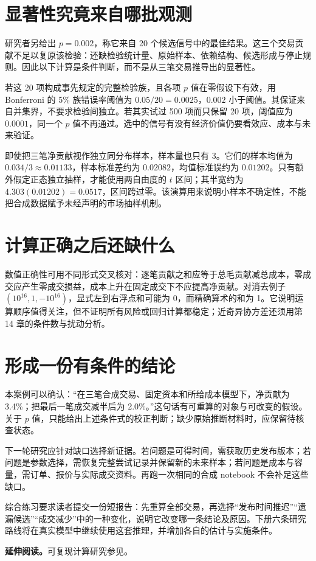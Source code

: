 \section{显著性究竟来自哪批观测}
研究者另给出 $p=0.002$，称它来自 20 个候选信号中的最佳结果。这三个交易贡献不足以复原该检验：还缺检验统计量、原始样本、依赖结构、候选形成与停止规则。因此以下计算是条件判断，而不是从三笔交易推导出的显著性。

若这 20 项构成事先规定的完整检验族，且各项 $p$ 值在零假设下有效，用 Bonferroni 的 5\% 族错误率阈值为 $0.05/20=0.0025$，$0.002$ 小于阈值。其保证来自并集界，不要求检验间独立。若其实试过 500 项而只保留 20 项，阈值应为 $0.0001$，同一个 $p$ 值不再通过。选中的信号有没有经济价值仍要看效应、成本与未来验证。

即使把三笔净贡献视作独立同分布样本，样本量也只有 3。它们的样本均值为 $0.034/3\approx0.01133$，样本标准差约为 $0.02082$，均值标准误约为 $0.01202$。只有额外假定正态独立抽样，才能使用两自由度的 $t$ 区间；其半宽约为 $4.303(0.01202)=0.0517$，区间跨过零。该演算用来说明小样本不确定性，不能把合成数据赋予未经声明的市场抽样机制。

\section{计算正确之后还缺什么}
数值正确性可用不同形式交叉核对：逐笔贡献之和应等于总毛贡献减总成本，零成交应产生零成交损益，成本上升在固定成交下不应提高净贡献。对消去例子 $(10^{16},1,-10^{16})$，显式左到右浮点和可能为 0，而精确算术的和为 1。它说明运算顺序值得关注，但不证明所有风险或回归计算都稳定；近奇异协方差还须用第 14 章的条件数与扰动分析。


\section{形成一份有条件的结论}
本案例可以确认：“在三笔合成交易、固定资本和所给成本模型下，净贡献为 3.4\%；把最后一笔成交减半后为 2.0\%。”这句话有可重算的对象与可改变的假设。关于 $p$ 值，只能给出上述条件式的校正判断；缺少原始推断材料时，应保留待核查状态。

下一轮研究应针对缺口选择新证据。若问题是可得时间，需获取历史发布版本；若问题是参数选择，需恢复完整尝试记录并保留新的未来样本；若问题是成本与容量，需订单、报价与实际成交资料。再跑一次相同的合成 notebook 不会补足这些缺口。

综合练习要求读者提交一份短报告：先重算全部交易，再选择“发布时间推迟”“遗漏候选”“成交减少”中的一种变化，说明它改变哪一条结论及原因。下册六条研究路线将在真实模型中继续使用这套推理，并增加各自的估计与实施条件。

\noindent\textbf{延伸阅读。}可复现计算研究参见\cite{sandve2013reproducible}。


